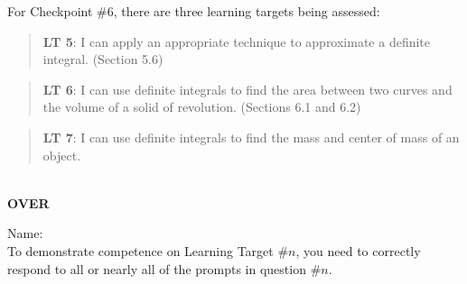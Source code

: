 \documentclass[11 pt]{article}
\begin{document}
 For Checkpoint \#6, there are three learning targets being assessed: 

\begin{quote}
{\bf LT 5}: I can apply an appropriate technique to approximate a definite integral. (Section 5.6)
\end{quote}

\begin{quote}
{\bf LT 6}: I can use definite integrals to find the area between two curves and the volume of a solid of revolution. (Sections 6.1 and 6.2)
\end{quote}

\begin{quote}
{\bf LT 7}: I can use definite integrals to find the mass and center of mass of an object.
\end{quote}

\noindent \hrulefill \\

\vfill \hfill {\bf OVER} 

\pagebreak

\noindent Name: \\ 

\noindent To demonstrate competence on Learning Target \#$n$, you need to correctly respond to all or nearly all of the prompts in question \#$n$.  
\end{document}
